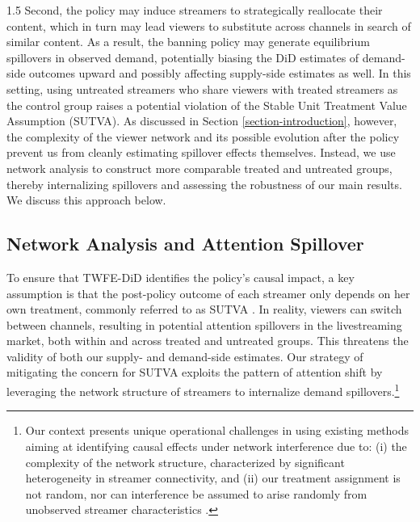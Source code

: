 \documentclass[a4paper,12pt]{article}
\begin{document}
\begin{spacing}{1.5}
Second, the policy may induce streamers to strategically reallocate their content, which in turn may lead viewers to substitute across channels in search of similar content. As a result, the banning policy may generate equilibrium spillovers in observed demand, potentially biasing the DiD estimates of demand-side outcomes upward and possibly affecting supply-side estimates as well. In this setting, using untreated streamers who share viewers with treated streamers as the control group raises a potential violation of the Stable Unit Treatment Value Assumption (SUTVA). As discussed in Section \ref{section-introduction}, however, the complexity of the viewer network and its possible evolution after the policy prevent us from cleanly estimating spillover effects themselves. Instead, we use network analysis to construct more comparable treated and untreated groups, thereby internalizing spillovers and assessing the robustness of our main results. We discuss this approach below.

\subsection{Network Analysis and Attention Spillover}\label{subsection-network}

To ensure that TWFE-DiD identifies the policy's causal impact, a key assumption is that the post-policy outcome of each streamer only depends on her own treatment, commonly referred to as SUTVA \citep{rubin1980randomization, rubin1990comment}. In reality,  viewers can switch between channels, resulting in potential attention spillovers in the livestreaming market, both within and across treated and untreated groups. This threatens the validity of both our supply- and demand-side estimates. Our strategy of mitigating the concern for SUTVA exploits the pattern of attention shift by leveraging the network structure of streamers to internalize demand spillovers.\footnote{Our context presents unique operational challenges in using existing methods aiming at identifying causal effects under network interference \citep{AronowSamii2017,li2022random} due to: (i) the complexity of the network structure, characterized by significant heterogeneity in streamer connectivity, and (ii) our treatment assignment is not random, nor can interference be assumed to arise randomly from unobserved streamer characteristics \citep{li2022random}.} 


\end{spacing}
\end{document}
